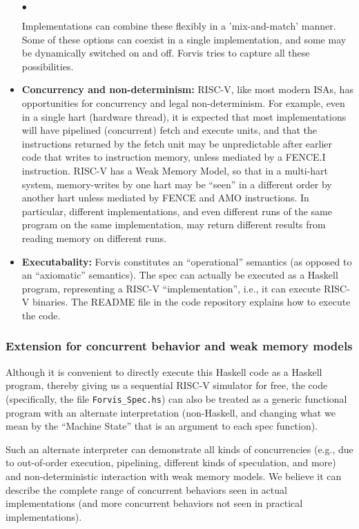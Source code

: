 \documentclass[11pt]{article}
\newenvironment{tightlist}%
{\begin{list}{$\bullet$}{%
    \setlength{\topsep}{0in}
    \setlength{\partopsep}{0in}
    \setlength{\itemsep}{0in}
    \setlength{\parsep}{0in}
    \setlength{\leftmargin}{1.5em}
    \setlength{\rightmargin}{0in}
    \setlength{\itemindent}{0in}
}
}%
{\end{list}
}
\begin{document}
\begin{itemize}
\begin{tightlist}
  \end{tightlist}

  Implementations can combine these flexibly in a 'mix-and-match'
  manner.  Some of these options can coexist in a single
  implementation, and some may be dynamically switched on and off.
  Forvis tries to capture all these possibilities.

\item {\bf Concurrency and non-determinism:} RISC-V, like most modern
ISAs, has opportunities for concurrency and legal non-determinism.
For example, even in a single hart (hardware thread), it is expected
that most implementations will have pipelined (concurrent) fetch and
execute units, and that the instructions returned by the fetch unit
may be unpredictable after earlier code that writes to instruction
memory, unless mediated by a FENCE.I instruction.  RISC-V has a Weak
Memory Model, so that in a multi-hart system, memory-writes by one
hart may be ``seen'' in a different order by another hart unless
mediated by FENCE and AMO instructions.  In particular, different
implementations, and even different runs of the same program on the
same implementation, may return different results from reading memory
on different runs.

\item {\bf Executabality:} Forvis constitutes an ``operational''
semantics (as opposed to an ``axiomatic'' semantics).  The spec can
actually be executed as a Haskell program, representing a RISC-V
``implementation'', i.e., it can execute RISC-V binaries.  The README
file in the code repository explains how to execute the code.

\end{itemize}


\subsubsection{Extension for concurrent behavior and weak memory models}

Although it is convenient to directly execute this Haskell code as a
Haskell program, thereby giving us a sequential RISC-V simulator for
free, the code (specifically, the file \verb|Forvis_Spec.hs|) can also
be treated as a generic functional program with an alternate
interpretation (non-Haskell, and changing what we mean by the
``Machine State'' that is an argument to each spec function).

Such an alternate interpreter can demonstrate all kinds of
concurrencies (e.g., due to out-of-order execution, pipelining,
different kinds of speculation, and more) and non-deterministic
interaction with weak memory models.  We believe it can describe the
complete range of concurrent behaviors seen in actual implementations
(and more concurrent behaviors not seen in practical implementations).
\end{document}
